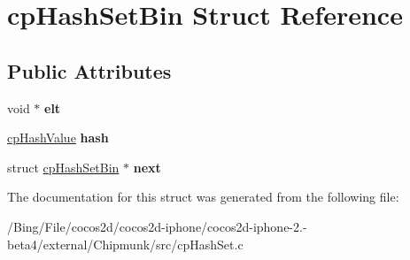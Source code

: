 \hypertarget{structcp_hash_set_bin}{\section{cp\-Hash\-Set\-Bin Struct Reference}
\label{structcp_hash_set_bin}
}
\subsection*{Public Attributes}
\begin{DoxyCompactItemize}
\item 
\hypertarget{structcp_hash_set_bin_a20cd24169e7b102fa1df607951da4ba1}{void $\ast$ {\bfseries elt}}\label{structcp_hash_set_bin_a20cd24169e7b102fa1df607951da4ba1}

\item 
\hypertarget{structcp_hash_set_bin_a25f8ba8b65dc720d3b108c5874b70ab1}{\hyperlink{group__basic_types_gae7eb4775a9f43914a15553ca65a048f4}{cp\-Hash\-Value} {\bfseries hash}}\label{structcp_hash_set_bin_a25f8ba8b65dc720d3b108c5874b70ab1}

\item 
\hypertarget{structcp_hash_set_bin_af3fcfc013d20a6bd06c6d5a2fa95e015}{struct \hyperlink{structcp_hash_set_bin}{cp\-Hash\-Set\-Bin} $\ast$ {\bfseries next}}\label{structcp_hash_set_bin_af3fcfc013d20a6bd06c6d5a2fa95e015}

\end{DoxyCompactItemize}


The documentation for this struct was generated from the following file\-:\begin{DoxyCompactItemize}
\item 
/\-Bing/\-File/cocos2d/cocos2d-\/iphone/cocos2d-\/iphone-\/2.-\/beta4/external/\-Chipmunk/src/cp\-Hash\-Set.\-c\end{DoxyCompactItemize}
